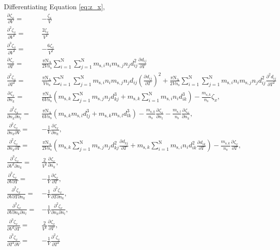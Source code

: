 \documentclass[english]{../thermomemo/thermomemo}
\newcommand*{\pd}[3][]{\frac{\partial^{#1}#2}{\partial{#3}^{#1}}}%
\newcommand*{\pdc}[3]{\frac{\partial^{2}#1}{\partial{#2}\partial{#3}}}%
\newcommand*{\pdcc}[3]{\frac{\partial^{3}#1}{\partial{#2}^{2}\partial{#3}}}%
\newcommand*{\pdth}[4]{\frac{\partial^{3}#1}{\partial{#2}\partial{#3}\partial{#4}}}%
\newcommand*{\lb}{\left(}
\newcommand*{\rb}{\right)}
\newcommand{\seg}{\ensuremath{\text{s}}\xspace}
\newcommand{\z}{\zeta}
\newcommand{\nc}{\ensuremath{\text{N}}\xspace}
\newcommand{\NA}{\ensuremath{\text{N}_{\text{A}}}\xspace}
\begin{document}
Differentiating Equation \ref{eq:z_x},
\begin{align}
  \label{eq:z_x_diff}
  \pd{\z_{x}}{V} =& -\frac{\z_{x}}{V} \\
  \pd[2]{\z_{x}}{V} =& \frac{2\z_{x}}{V^2}\\
  \pd[3]{\z_{x}}{V} =& -\frac{6\z_{x}}{V^2}\\
  \pd{\z_{x}}{T} =& \frac{\pi \NA}{2 V n_{\seg}} \sum_{i=1}^\nc\sum_{j=1}^\nc m_{\seg,i} n_im_{\seg,j}n_j d_{ij}^2 \pd{d_{ij}}{T}\\
  \pd[2]{\z_{x}}{T} =& \frac{\pi \NA}{V n_{\seg}} \sum_{i=1}^\nc\sum_{j=1}^\nc m_{\seg,i} n_im_{\seg,j}n_j d_{ij} \lb\pd{d_{ij}}{T}\rb^2 + \frac{\pi \NA}{2 V n_{\seg}} \sum_{i=1}^\nc\sum_{j=1}^\nc m_{\seg,i} n_im_{\seg,j}n_j d_{ij}^2 \pd[2]{d_{ij}}{T}\\
  \pd{\z_{x}}{n_k} =& \frac{\pi \NA}{6 V n_\seg} \lb m_{\seg,k} \sum_{j=1}^\nc m_{\seg,j}n_j d_{kj}^3  + m_{\seg,k} \sum_{i=1}^\nc m_{\seg,i}n_i d_{ik}^3\rb - \frac{m_{\seg,k}}{n_\seg} \z_{x},\\
  \pdc{\z_{x}}{n_k}{n_l} =& \frac{\pi \NA}{6 V n_\seg} \lb m_{\seg,k} m_{\seg,l} d_{lj}^3  + m_{\seg,k}m_{\seg,l} d_{lk}^3\rb - \frac{m_{\seg,k}}{n_\seg} \pd{\z_{x}}{n_l} - \frac{m_{\seg,l}}{n_\seg} \pd{\z_{x}}{n_k}, \\
  \pdc{\z_{x}}{n_k}{V} =& -\frac{1}{V} \pd{\z_{x}}{n_k},\\
  \pdc{\z_{x}}{n_k}{T} =& \frac{\pi \NA}{2 V n_\seg} \lb m_{\seg,k} \sum_{j=1}^\nc m_{\seg,j}n_j d_{kj}^2 \pd{d_{kj}}{T}  + m_{\seg,k} \sum_{i=1}^\nc m_{\seg,i}n_i d_{ik}^2\pd{d_{ik}}{T}\rb - \frac{m_{\seg,k}}{n_\seg} \pd{\z_{x}}{T},\\
  \pdcc{\z_{x}}{V}{n_k} =& \frac{2}{V^2} \pd{\z_{x}}{n_k},\\
  \pdc{\z_{x}}{V}{T} =& -\frac{1}{V} \pd{\z_{x}}{T},\\
  \pdth{\z_{x}}{V}{T}{n_k} =& -\frac{1}{V} \pdc{\z_{x}}{T}{n_k},\\
  \pdth{\z_{x}}{V}{n_k}{n_l} =& -\frac{1}{V} \pdc{\z_{x}}{n_k}{n_l},\\
  \pdcc{\z_{x}}{V}{T} =& \frac{2}{V^2} \pd{\z_{x}}{T},\\
  \pdcc{\z_{x}}{T}{V} =& -\frac{1}{V} \pd[2]{\z_{x}}{T}
\end{align}
\end{document}
